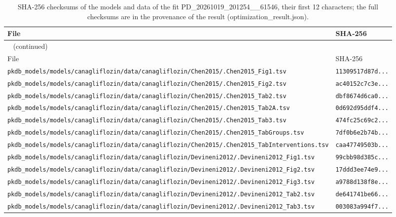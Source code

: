\begin{longtable}{ll}
\caption{SHA-256 checksums of the models and data of the fit PD\_20261019\_201254\_\_61546, their first 12 characters; the full checksums are in the provenance of the result (optimization\_result.json).}\label{tab:checksums:PD_20261019_201254__61546} \\
\toprule
File & SHA-256 \\
\midrule
\endfirsthead
\multicolumn{2}{l}{\small\tablename~\thetable{} (continued)} \\
\toprule
File & SHA-256 \\
\midrule
\endhead
\bottomrule
\endlastfoot
\texttt{pkdb\_models/models/canagliflozin/data/canagliflozin/Chen2015/.Chen2015\_Fig1.tsv} & \texttt{11309517d87d...} \\
\texttt{pkdb\_models/models/canagliflozin/data/canagliflozin/Chen2015/.Chen2015\_Fig2.tsv} & \texttt{ac40152c7c3e...} \\
\texttt{pkdb\_models/models/canagliflozin/data/canagliflozin/Chen2015/.Chen2015\_Tab2.tsv} & \texttt{dbf8674d6ca0...} \\
\texttt{pkdb\_models/models/canagliflozin/data/canagliflozin/Chen2015/.Chen2015\_Tab2A.tsv} & \texttt{0d692d95ddf4...} \\
\texttt{pkdb\_models/models/canagliflozin/data/canagliflozin/Chen2015/.Chen2015\_Tab3.tsv} & \texttt{474fc25c69c2...} \\
\texttt{pkdb\_models/models/canagliflozin/data/canagliflozin/Chen2015/.Chen2015\_TabGroups.tsv} & \texttt{7df0b6e2b74b...} \\
\texttt{pkdb\_models/models/canagliflozin/data/canagliflozin/Chen2015/.Chen2015\_TabInterventions.tsv} & \texttt{caa47749503b...} \\
\texttt{pkdb\_models/models/canagliflozin/data/canagliflozin/Devineni2012/.Devineni2012\_Fig1.tsv} & \texttt{99cbb98d385c...} \\
\texttt{pkdb\_models/models/canagliflozin/data/canagliflozin/Devineni2012/.Devineni2012\_Fig2.tsv} & \texttt{17ddd3ee74e9...} \\
\texttt{pkdb\_models/models/canagliflozin/data/canagliflozin/Devineni2012/.Devineni2012\_Fig3.tsv} & \texttt{a9788d138f8e...} \\
\texttt{pkdb\_models/models/canagliflozin/data/canagliflozin/Devineni2012/.Devineni2012\_Tab2.tsv} & \texttt{de641741be66...} \\
\texttt{pkdb\_models/models/canagliflozin/data/canagliflozin/Devineni2012/.Devineni2012\_Tab3.tsv} & \texttt{003083a994f7...} \\

\end{longtable}
